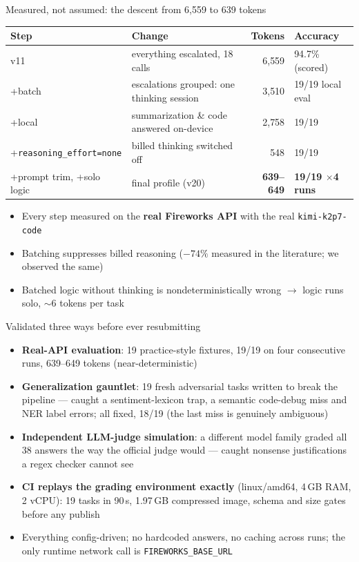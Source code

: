 \documentclass[aspectratio=169]{beamer}
\begin{document}
\begin{frame}{Measured, not assumed: the descent from 6{,}559 to 639 tokens}
  \centering
  \begin{tabular}{llrl}
    \toprule
    \textbf{Step} & \textbf{Change} & \textbf{Tokens} & \textbf{Accuracy} \\
    \midrule
    v11 & everything escalated, 18 calls & 6{,}559 & 94.7\% (scored) \\
    +batch & escalations grouped: one thinking session & 3{,}510 & 19/19 local eval \\
    +local & summarization \& code answered on-device & 2{,}758 & 19/19 \\
    +\texttt{reasoning\_effort=none} & billed thinking switched off & 548 & 19/19 \\
    +prompt trim, +solo logic & final profile (v20) & \textbf{639--649} & \textbf{19/19 $\times$4 runs} \\
    \bottomrule
  \end{tabular}
  \vspace{0.4cm}
  \begin{itemize}
    \item Every step measured on the \textbf{real Fireworks API} with the real \texttt{kimi-k2p7-code}
    \item Batching suppresses billed reasoning ($-74\%$ measured in the literature; we observed the same)
    \item Batched logic without thinking is nondeterministically wrong $\rightarrow$ logic runs solo, $\sim$6 tokens per task
  \end{itemize}
\end{frame}

\begin{frame}{Validated three ways before ever resubmitting}
  \begin{itemize}
    \item \textbf{Real-API evaluation}: 19 practice-style fixtures, 19/19 on four consecutive runs, 639--649 tokens (near-deterministic)
    \item \textbf{Generalization gauntlet}: 19 fresh adversarial tasks written to break the pipeline --- caught a sentiment-lexicon trap, a semantic code-debug miss and NER label errors; all fixed, 18/19 (the last miss is genuinely ambiguous)
    \item \textbf{Independent LLM-judge simulation}: a different model family graded all 38 answers the way the official judge would --- caught nonsense justifications a regex checker cannot see
    \item \textbf{CI replays the grading environment exactly} (linux/amd64, 4\,GB RAM, 2 vCPU): 19 tasks in 90\,s, 1.97\,GB compressed image, schema and size gates before any publish
    \item Everything config-driven; no hardcoded answers, no caching across runs; the only runtime network call is \texttt{FIREWORKS\_BASE\_URL}
  \end{itemize}
\end{frame}
\end{document}
